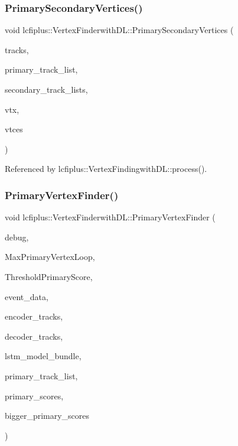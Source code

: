 \subsubsection{Primary\+Secondary\+Vertices()}
{\footnotesize\ttfamily void lcfiplus\+::\+Vertex\+Finderwith\+D\+L\+::\+Primary\+Secondary\+Vertices (\begin{DoxyParamCaption}\item[{\textbf{ Track\+Vec} \&}]{tracks,  }\item[{std\+::vector$<$ int $>$}]{primary\+\_\+track\+\_\+list,  }\item[{std\+::vector$<$ std\+::vector$<$ int $>$ $>$}]{secondary\+\_\+track\+\_\+lists,  }\item[{std\+::vector$<$ \textbf{ Vertex} $\ast$$>$ $\ast$\&}]{vtx,  }\item[{std\+::vector$<$ \textbf{ Vertex} $\ast$$>$ $\ast$\&}]{vtces }\end{DoxyParamCaption})}



Referenced by lcfiplus\+::\+Vertex\+Findingwith\+D\+L\+::process().

\mbox{\label{namespacelcfiplus_1_1VertexFinderwithDL_acb151fc9eb0432374b6a4324e2799faf}} 
\subsubsection{Primary\+Vertex\+Finder()}
{\footnotesize\ttfamily void lcfiplus\+::\+Vertex\+Finderwith\+D\+L\+::\+Primary\+Vertex\+Finder (\begin{DoxyParamCaption}\item[{bool}]{debug,  }\item[{int}]{Max\+Primary\+Vertex\+Loop,  }\item[{double}]{Threshold\+Primary\+Score,  }\item[{std\+::vector$<$ std\+::vector$<$ double $>$ $>$}]{event\+\_\+data,  }\item[{std\+::vector$<$ std\+::vector$<$ double $>$ $>$}]{encoder\+\_\+tracks,  }\item[{std\+::vector$<$ std\+::vector$<$ double $>$ $>$}]{decoder\+\_\+tracks,  }\item[{tensorflow\+::\+Saved\+Model\+Bundle\+Lite \&}]{lstm\+\_\+model\+\_\+bundle,  }\item[{std\+::vector$<$ int $>$ \&}]{primary\+\_\+track\+\_\+list,  }\item[{std\+::vector$<$ std\+::vector$<$ std\+::vector$<$ double $>$ $>$ $>$ \&}]{primary\+\_\+scores,  }\item[{std\+::vector$<$ double $>$ \&}]{bigger\+\_\+primary\+\_\+scores }\end{DoxyParamCaption})}



